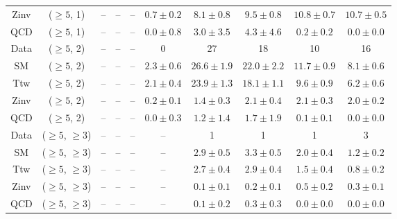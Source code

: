 \begin{table}[h!]
{\begin{tabular}{cccccccccc}
	Zinv & ($\ge5$, 1) & -- & -- & -- & $0.7\pm 0.2$ & $8.1\pm 0.8$ & $9.5\pm 0.8$ & $10.8\pm 0.7$ & $10.7\pm 0.5$ \\[0.5ex] 
	QCD & ($\ge5$, 1) & -- & -- & -- & $0.0\pm 0.8$ & $3.0\pm 3.5$ & $4.3\pm 4.6$ & $0.2\pm 0.2$ & $0.0\pm 0.0$ \\[0.5ex] 
	Data & ($\ge5$, 2) & -- & -- & -- & 0 & 27 & 18 & 10 & 16 \\[0.5ex] 
	SM & ($\ge5$, 2) & -- & -- & -- & $2.3\pm 0.6$ & $26.6\pm 1.9$ & $22.0\pm 2.2$ & $11.7\pm 0.9$ & $8.1\pm 0.6$ \\[0.5ex] 
	Ttw & ($\ge5$, 2) & -- & -- & -- & $2.1\pm 0.4$ & $23.9\pm 1.3$ & $18.1\pm 1.1$ & $9.6\pm 0.9$ & $6.2\pm 0.6$ \\[0.5ex] 
	Zinv & ($\ge5$, 2) & -- & -- & -- & $0.2\pm 0.1$ & $1.4\pm 0.3$ & $2.1\pm 0.4$ & $2.1\pm 0.3$ & $2.0\pm 0.2$ \\[0.5ex] 
	QCD & ($\ge5$, 2) & -- & -- & -- & $0.0\pm 0.3$ & $1.2\pm 1.4$ & $1.7\pm 1.9$ & $0.1\pm 0.1$ & $0.0\pm 0.0$ \\[0.5ex] 
	Data & ($\ge5$, $\ge3$) & -- & -- & -- & -- & 1 & 1 & 1 & 3 \\[0.5ex] 
	SM & ($\ge5$, $\ge3$) & -- & -- & -- & -- & $2.9\pm 0.5$ & $3.3\pm 0.5$ & $2.0\pm 0.4$ & $1.2\pm 0.2$ \\[0.5ex] 
	Ttw & ($\ge5$, $\ge3$) & -- & -- & -- & -- & $2.7\pm 0.4$ & $2.9\pm 0.4$ & $1.5\pm 0.4$ & $0.8\pm 0.2$ \\[0.5ex] 
	Zinv & ($\ge5$, $\ge3$) & -- & -- & -- & -- & $0.1\pm 0.1$ & $0.2\pm 0.1$ & $0.5\pm 0.2$ & $0.3\pm 0.1$ \\[0.5ex] 
	QCD & ($\ge5$, $\ge3$) & -- & -- & -- & -- & $0.1\pm 0.2$ & $0.3\pm 0.3$ & $0.0\pm 0.0$ & $0.0\pm 0.0$ \\[0.5ex] 
	\hline
	\hline
\end{tabular}}
\end{table}
